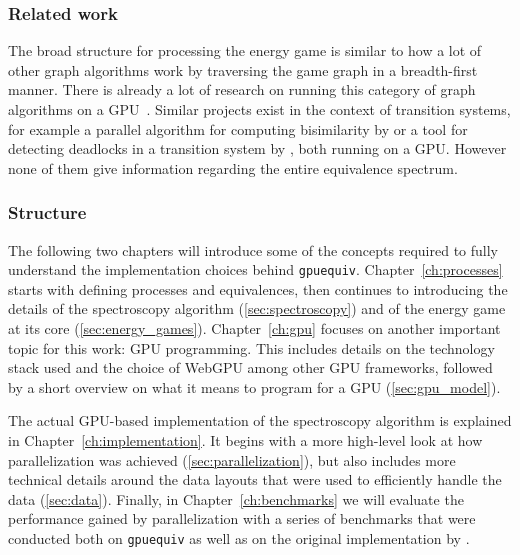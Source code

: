 \subsubsection{Related work}

The broad structure for processing the energy game
is similar to how a lot of other graph algorithms work
by traversing the game graph in a breadth-first manner.
There is already a lot of research on running this category of graph
algorithms on a GPU~\cite{Merrill2015,Busato2018,Hijma2023}.
Similar projects exist in the context of transition systems,
for example a parallel algorithm for computing bisimilarity
by \textcite{Martens2023}
or a tool for detecting deadlocks in a transition system
by \textcite{Wijs2023},
both running on a GPU\@.
However none of them give information
regarding the entire equivalence spectrum.

\subsubsection{Structure}

The following two chapters will introduce some of the concepts required to
fully understand the implementation choices behind \texttt{gpuequiv}.
Chapter~\ref{ch:processes} starts with defining processes and equivalences,
then continues to introducing the details of
the spectroscopy algorithm (\ref{sec:spectroscopy})
and of the energy game at its core (\ref{sec:energy_games}).
Chapter~\ref{ch:gpu} focuses on another important topic for this work:
GPU programming.
This includes details on the technology stack used
and the choice of WebGPU among other GPU frameworks,
followed by a short overview on what it means
to program for a GPU (\ref{sec:gpu_model}).

The actual GPU-based implementation of the spectroscopy algorithm is explained
in Chapter~\ref{ch:implementation}.
It begins with a more high-level look at how parallelization was achieved
(\ref{sec:parallelization}),
but also includes more technical details around the data layouts
that were used to efficiently handle the data (\ref{sec:data}).
Finally, in Chapter~\ref{ch:benchmarks} we will evaluate the performance
gained by parallelization with a series of benchmarks that were
conducted both on \texttt{gpuequiv} as well as on the original implementation
by \textcite{bisping2023process}.

